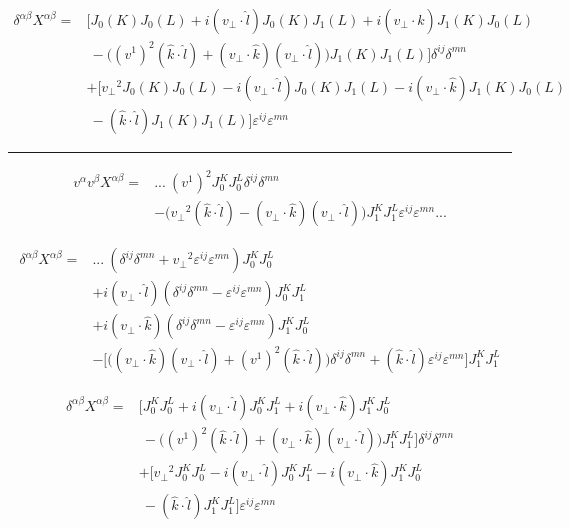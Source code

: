 \documentclass[12pt]{article}
\begin{document}
\begin{equation*}
\begin{split}
\delta^{\alpha \beta} X^{\alpha \beta} = & \Big[ J_0(K) J_0(L) + i(v_\perp \cdot \hat{l}) J_0(K) J_1(L) + i(v_\perp \cdot \hat{k}) J_1(K) J_0(L)\\
& ~ -\Big((v^1)^2 (\hat{k} \cdot \hat{l})+(v_\perp \cdot \hat{k}) (v_\perp \cdot \hat{l}) \Big)J_1(K) J_1(L) \Big] \delta^{ij} \delta^{mn}\\
& + \Big[ {v_\perp}^2 J_0(K)J_0(L) - i (v_\perp \cdot \hat{l}) J_0(K) J_1(L) - i (v_\perp \cdot \hat{k}) J_1(K) J_0(L)\\
& ~ - (\hat{k} \cdot \hat{l}) J_1(K) J_1(L) \Big] \varepsilon^{ij} \varepsilon^{mn}
\end{split}
\end{equation*}

\hrule

\begin{equation*}
\begin{split}
v^\alpha v^\beta X^{\alpha \beta} = & ...~ (v^1)^2 J_0 ^K J_0^L \delta^{ij} \delta^{mn} \\
& - \Big( {v_\perp}^2 (\hat{k} \cdot \hat{l}) - (v_\perp \cdot \hat{k})(v_\perp \cdot \hat{l})\Big) J_1 ^K J_1^L \varepsilon^{ij} \varepsilon^{mn} ...
\end{split}
\end{equation*}

\begin{equation*}
\begin{split}
\delta^{\alpha \beta} X^{\alpha \beta}=& ...~ (\delta^{ij} \delta^{mn} + {v_\perp}^2 \varepsilon^{ij} \varepsilon^{mn}) J_0 ^K J_0^L \\
& + i (v_\perp \cdot \hat{l}) (\delta^{ij} \delta^{mn} - \varepsilon^{ij} \varepsilon^{mn}) J_0 ^K J_1^L \\
& + i (v_\perp \cdot \hat{k}) (\delta^{ij} \delta^{mn} - \varepsilon^{ij} \varepsilon^{mn}) J_1 ^K J_0^L \\
& - \bigg[ \Big((v_\perp \cdot \hat{k}) (v_\perp \cdot \hat{l}) + (v^1)^2 (\hat{k} \cdot \hat{l}) \Big) \delta^{ij} \delta^{mn} + (\hat{k} \cdot \hat{l}) \varepsilon^{ij}\varepsilon^{mn} \bigg] J_1 ^K J_1^L \end{split}
\end{equation*}

\begin{equation*}
\begin{split}
\delta^{\alpha \beta} X^{\alpha \beta} = & \Big[ J_0^K J_0^L + i(v_\perp \cdot \hat{l}) J_0^K J_1^L + i(v_\perp \cdot \hat{k}) J_1^K J_0^L\\
& ~ -\Big((v^1)^2 (\hat{k} \cdot \hat{l})+(v_\perp \cdot \hat{k}) (v_\perp \cdot \hat{l}) \Big)J_1^K J_1^L \Big] \delta^{ij} \delta^{mn}\\
& + \Big[ {v_\perp}^2 J_0^KJ_0^L - i (v_\perp \cdot \hat{l}) J_0^K J_1^L - i (v_\perp \cdot \hat{k}) J_1^K J_0^L\\
& ~ - (\hat{k} \cdot \hat{l}) J_1^K J_1^L \Big] \varepsilon^{ij} \varepsilon^{mn}
\end{split}
\end{equation*}
\end{document}
